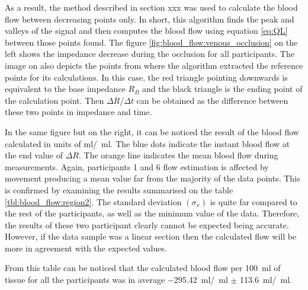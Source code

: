 As a result, the method described in section xxx was used to calculate the blood flow between decreasing points only. In short, this algorithm finds the peak and valleys of the signal and then computes the blood flow using equation \ref{eq:QL} between those points found. The figure \ref{fig:blood_flow:venous_occlusion} on the left shows the impedance decrease during the occlusion for all participants. The image on also depicts the points from where the algorithm extracted the reference points for its calculations. In this case, the red triangle pointing downwards is equivalent to the base impedance $R_B$ and the black triangle is the ending point of the calculation point. Then $\Delta R / \Delta t$ can be obtained as the difference between these two points in impedance and time. 

In the same figure but on the right, it can be noticed the result of the blood flow calculated in units of \si{\ml /  \ml}. The blue dots indicate the instant blood flow at the end value of $\Delta R$. The orange line indicates the mean blood flow during measurements. Again, participants 1 and 6 flow estimation is affected by movement producing a mean value far from the majority of the data points. This is confirmed by examining the results summarised on the table \ref{tbl:blood_flow:region2}. The standard deviation $(\sigma_x)$ is quite far compared to the rest of the participants, as well as the minimum value of the data. Therefore, the results of these two participant clearly cannot be expected being accurate. However, if the data sample was a linear section then the calculated flow will be more in agreement with the expected values. 

From this table can be noticed that the calculated blood flow per \SI{100}{\ml} of tissue for all the participants was in average \SI{-295.42}{\ml / \ml} $\pm$ \SI{113.6}{\ml/\ml}. 

